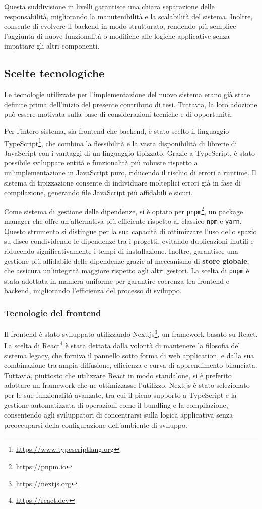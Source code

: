 Questa suddivisione in livelli garantisce una chiara separazione delle responsabilità, migliorando la manutenibilità e la scalabilità del sistema. Inoltre, consente di evolvere il backend in modo strutturato, rendendo più semplice l'aggiunta di nuove funzionalità o modifiche alle logiche applicative senza impattare gli altri componenti.

\subsection{Scelte tecnologiche}
Le tecnologie utilizzate per l'implementazione del nuovo sistema erano già state definite prima dell'inizio del presente contributo di tesi. Tuttavia, la loro adozione può essere motivata sulla base di considerazioni tecniche e di opportunità.

Per l'intero sistema, sia frontend che backend, è stato scelto il linguaggio TypeScript\footnote{\url{https://www.typescriptlang.org}}, che combina la flessibilità e la vasta disponibilità di librerie di JavaScript con i vantaggi di un linguaggio tipizzato. Grazie a TypeScript, è stato possibile sviluppare entità e funzionalità più robuste rispetto a un'implementazione in JavaScript puro, riducendo il rischio di errori a runtime. Il sistema di tipizzazione consente di individuare molteplici errori già in fase di compilazione, generando file JavaScript più affidabili e sicuri.

Come sistema di gestione delle dipendenze, si è optato per \texttt{pnpm}\footnote{\url{https://pnpm.io}}, un package manager che offre un'alternativa più efficiente rispetto al classico \texttt{npm} e \texttt{yarn}. Questo strumento si distingue per la sua capacità di ottimizzare l'uso dello spazio su disco condividendo le dipendenze tra i progetti, evitando duplicazioni inutili e riducendo significativamente i tempi di installazione. Inoltre, garantisce una gestione più affidabile delle dipendenze grazie al meccanismo di \textbf{store globale}, che assicura un'integrità maggiore rispetto agli altri gestori. La scelta di \texttt{pnpm} è stata adottata in maniera uniforme per garantire coerenza tra frontend e backend, migliorando l'efficienza del processo di sviluppo.

\subsubsection{Tecnologie del frontend}
Il frontend è stato sviluppato utilizzando Next.js\footnote{\url{https://nextjs.org}}, un framework basato su React. La scelta di React\footnote{\url{https://react.dev}} è stata dettata dalla volontà di mantenere la filosofia del sistema legacy, che forniva il pannello sotto forma di web application, e dalla sua combinazione tra ampia diffusione, efficienza e curva di apprendimento bilanciata. Tuttavia, piuttosto che utilizzare React in modo standalone, si è preferito adottare un framework che ne ottimizzasse l’utilizzo. Next.js è stato selezionato per le sue funzionalità avanzate, tra cui il pieno supporto a TypeScript e la gestione automatizzata di operazioni come il bundling e la compilazione, consentendo agli sviluppatori di concentrarsi sulla logica applicativa senza preoccuparsi della configurazione dell'ambiente di sviluppo.

